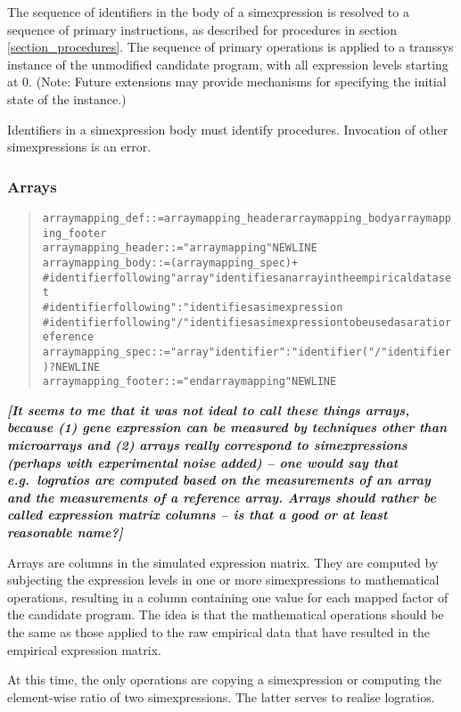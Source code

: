 \documentclass[a4paper,fleqn]{article}
\newcommand{\todo}[1]{\rule{0pt}{0pt}\marginpar{\rule{1ex}{1ex}}\textbf{\emph{[#1]}}}
\newenvironment{ebnfrule}{\begin{footnotesize}\begin{quote}\begin{alltt}}{\end{alltt}\end{quote}\end{footnotesize}}
\begin{document}
The sequence of identifiers in the body of a simexpression is resolved
to a sequence of primary instructions, as described for procedures in
section \ref{section_procedures}. The sequence of primary operations
is applied to a transsys instance of the unmodified candidate program,
with all expression levels starting at $0$. (Note: Future extensions
may provide mechanisms for specifying the initial state of the instance.)

Identifiers in a simexpression body must identify
procedures. Invocation of other simexpressions is an error.


\subsubsection{Arrays}

\begin{ebnfrule}
arraymapping_def ::= arraymapping_header arraymapping_body arraymapping_footer
arraymapping_header ::= "arraymapping" NEWLINE
arraymapping_body ::= (arraymapping_spec)+
# identifier following "array" identifies an array in the empirical data set
# identifier following ":" identifies a simexpression
# identifier following "/" identifies a simexpression to be used as a ratio reference
arraymapping_spec ::= "array" identifier ":" identifier ( "/" identifier)? NEWLINE
arraymapping_footer ::= "endarraymapping" NEWLINE
\end{ebnfrule}

\todo{It seems to me that it was not ideal to call these things
  arrays, because (1) gene expression can be measured by techniques
  other than microarrays and (2) arrays really correspond to
  simexpressions (perhaps with experimental noise added) -- one would
  say that e.g.\ logratios are computed based on the measurements of
  an array and the measurements of a reference array. Arrays should
  rather be called expression matrix columns -- is that a good or at
  least reasonable name?}

Arrays are columns in the simulated expression matrix. They are
computed by subjecting the expression levels in one or more
simexpressions to mathematical operations, resulting in a column
containing one value for each mapped factor of the candidate program.
The idea is that the mathematical operations should be the same as
those applied to the raw empirical data that have resulted in the
empirical expression matrix.

At this time, the only operations are copying a simexpression or
computing the element-wise ratio of two simexpressions. The latter
serves to realise logratios.
\end{document}
